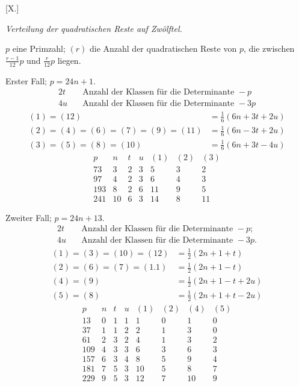 \clearpage
{}
\par\bigskip{}\centerline{[X.]}\medskip
\begin{center}\emph{Verteilung der quadratischen Reste auf Zwölftel.}\end{center}
$p$ eine Primzahl; $(r)$ die Anzahl der quadratischen Reste von $p$, die zwischen $\frac{r-1}{12}p$ und $\frac r{12}p$ liegen.

Erster Fall; $p=24n+1$.
\[
\begin{aligned}
2t&\quad\text{Anzahl der Klassen für die Determinante }-p\\
4u&\quad\text{Anzahl der Klassen für die Determinante }-3p
\end{aligned}
\]
\[
\begin{aligned}
(1)=(12)&=\tfrac16(6n+3t+2u)\\
(2)=(4)=(6)=(7)=(9)=(11)&=\tfrac16(6n-3t+2u)\\
(3)=(5)=(8)=(10)&=\tfrac16(6n+3t-4u)
\end{aligned}
\]
\[
\begin{array}{r|r|r|r|r|r|r}
p&n&t&u&(1)&(2)&(3)\\\hline
73&3&2&3&5&3&2\\
97&4&2&3&6&4&3\\
193&8&2&6&11&9&5\\
241&10&6&3&14&8&11
\end{array}
\]

Zweiter Fall; $p=24n+13$.
\[
\begin{aligned}
2t&\quad\text{Anzahl der Klassen für die Determinante }-p;\\
4u&\quad\text{Anzahl der Klassen für die Determinante }-3p.
\end{aligned}
\]
\[
\begin{aligned}
(1)=(3)=(10)=(12)&=\tfrac12(2n+1+t)\\
(2)=(6)=(7)=(1.1)&=\tfrac12(2n+1-t)\\
(4)=(9)&=\tfrac12(2n+1-t+2u)\\
(5)=(8)&=\tfrac12(2n+1+t-2u)
\end{aligned}
\]
\[
\begin{array}{r|r|r|r|r|r|r|r}
p&n&t&u&(1)&(2)&(4)&(5)\\\hline
13&0&1&1&1&0&1&0\\
37&1&1&2&2&1&3&0\\
61&2&3&2&4&1&3&2\\
109&4&3&3&6&3&6&3\\
157&6&3&4&8&5&9&4\\
181&7&5&3&10&5&8&7\\
229&9&5&3&12&7&10&9
\end{array}
\]

